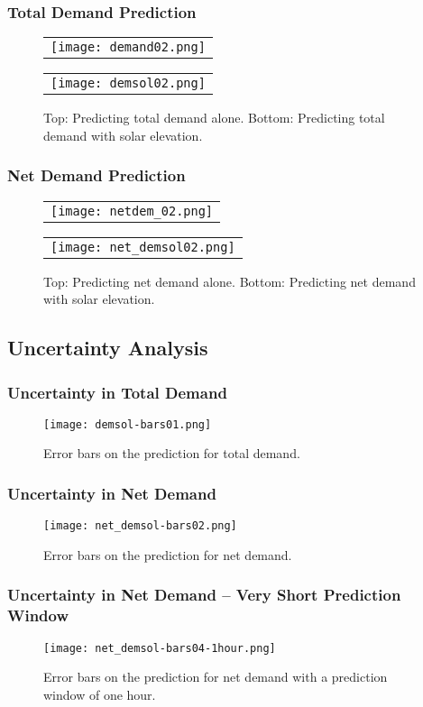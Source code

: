 \begin{frame}
  \frametitle{Total Demand Prediction}
  \begin{figure}
  \centering
  \begin{tabular}{@{}c@{}}
    \texttt{[image: demand02.png]}
  \end{tabular}

  \begin{tabular}{@{}c@{}}
    \texttt{[image: demsol02.png]}
  \end{tabular}

  \caption{Top: Predicting total demand alone. Bottom: Predicting total demand with solar elevation.}\label{fig:myfig}
\end{figure}
\end{frame}

\begin{frame}
  \frametitle{Net Demand Prediction}
  \begin{figure}
  \centering
  \begin{tabular}{@{}c@{}}
    \texttt{[image: netdem\_02.png]}
  \end{tabular}

  \begin{tabular}{@{}c@{}}
    \texttt{[image: net\_demsol02.png]}
  \end{tabular}

  \caption{Top: Predicting net demand alone. Bottom: Predicting net demand with solar elevation.}\label{fig:myfig}
\end{figure}
\end{frame}

\subsection{Uncertainty Analysis}
\begin{frame}
  \frametitle{Uncertainty in Total Demand}
  \begin{figure}
    \centering
    \texttt{[image: demsol-bars01.png]}
    \caption{Error bars on the prediction for total demand.}
    \label{}
  \end{figure}
\end{frame}
\begin{frame}
  \frametitle{Uncertainty in Net Demand}
  \begin{figure}
    \centering
    \texttt{[image: net\_demsol-bars02.png]}
    \caption{Error bars on the prediction for net demand.}
    \label{}
  \end{figure}
\end{frame}
\begin{frame}
  \frametitle{Uncertainty in Net Demand -- Very Short Prediction Window}
  \begin{figure}
    \centering
    \texttt{[image: net\_demsol-bars04-1hour.png]}
    \caption{Error bars on the prediction for net demand with a prediction window of one hour.}
    \label{}
  \end{figure}
\end{frame}
